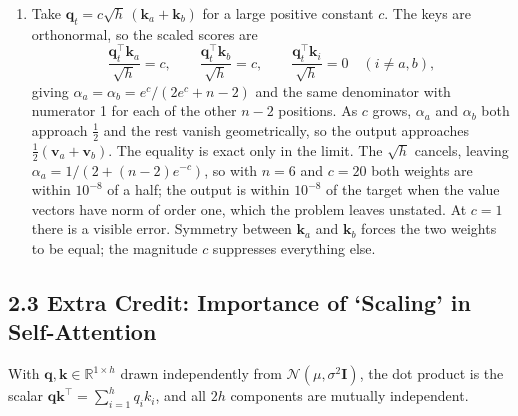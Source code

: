 \documentclass[11pt]{article}
\begin{document}
\begin{enumerate}
  \item Take $\mathbf{q}_t = c\sqrt{h}\,(\mathbf{k}_a + \mathbf{k}_b)$ for a large positive constant $c$. The
        keys are orthonormal, so the scaled scores are
        \[
          \frac{\mathbf{q}_t^{\top}\mathbf{k}_a}{\sqrt{h}} = c, \qquad
          \frac{\mathbf{q}_t^{\top}\mathbf{k}_b}{\sqrt{h}} = c, \qquad
          \frac{\mathbf{q}_t^{\top}\mathbf{k}_i}{\sqrt{h}} = 0 \quad (i \neq a, b),
        \]
        giving $\alpha_a = \alpha_b = e^{c} / (2e^{c} + n - 2)$ and the same denominator with numerator 1 for
        each of the other $n-2$ positions. As $c$ grows, $\alpha_a$ and $\alpha_b$ both approach $\tfrac{1}{2}$
        and the rest vanish geometrically, so the output approaches
        $\tfrac{1}{2}(\mathbf{v}_a + \mathbf{v}_b)$. The equality is exact only in the limit. The $\sqrt{h}$ cancels, leaving
        $\alpha_a = 1/(2 + (n-2)e^{-c})$, so with $n = 6$ and $c = 20$ both weights are within
        $10^{-8}$ of a half; the output is within $10^{-8}$ of the target when the value vectors have
        norm of order one, which the problem leaves unstated. At $c = 1$ there is a visible
        error. Symmetry between $\mathbf{k}_a$ and $\mathbf{k}_b$ forces the two weights to be equal; the
        magnitude $c$ suppresses everything else.
\end{enumerate}

\subsection*{2.3 Extra Credit: Importance of `Scaling' in Self-Attention}

With $\mathbf{q}, \mathbf{k} \in \mathbb{R}^{1 \times h}$ drawn independently from
$\mathcal{N}(\mu, \sigma^2 \mathbf{I})$, the dot product is the scalar
$\mathbf{q}\mathbf{k}^{\top} = \sum_{i=1}^{h} q_i k_i$, and all $2h$ components are mutually independent.
\end{document}
